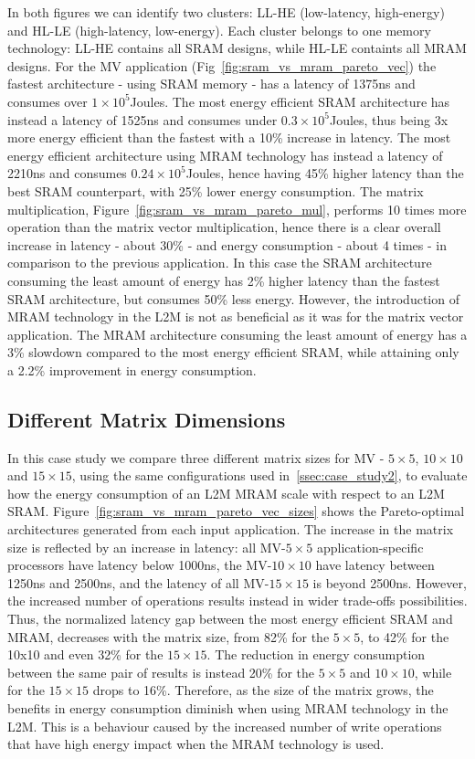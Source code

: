 In both figures we can identify two clusters: LL-HE (low-latency, high-energy) and HL-LE (high-latency, low-energy). Each cluster belongs to one memory technology: LL-HE contains all SRAM designs, while HL-LE containts all MRAM designs.
For the MV application (Fig~\ref{fig:sram_vs_mram_pareto_vec}) the fastest architecture - using SRAM memory - has a latency of 1375ns and consumes over $1\times10^5$Joules. The most energy efficient SRAM architecture has instead a latency of 1525ns and consumes under $0.3\times10^5$Joules, thus being 3x more energy efficient than the fastest with a 10\% increase in latency. The most energy efficient architecture using MRAM technology has instead a latency of 2210ns and consumes $0.24\times10^5$Joules, hence having 45\% higher latency than the best SRAM counterpart, with 25\% lower energy consumption. The matrix multiplication, Figure~\ref{fig:sram_vs_mram_pareto_mul}, performs 10 times more operation than the matrix vector multiplication, hence there is a clear overall increase in latency - about 30\% - and energy consumption - about 4 times -  in comparison to the previous application. In this case the SRAM architecture consuming the least amount of energy has 2\% higher latency than the fastest SRAM architecture, but consumes 50\% less energy. However, the introduction of MRAM technology in the L2M is not as beneficial as it was for the matrix vector application. The MRAM architecture consuming the least amount of energy has a 3\% slowdown compared to the most energy efficient SRAM, while attaining only a 2.2\% improvement in energy consumption.


\subsection{Different Matrix Dimensions}
\label{ssec:case_study3}
In this case study we compare three different matrix sizes for MV - $5\times5$, $10\times10$ and $15\times15$, using the same configurations used in~\ref{ssec:case_study2}, to evaluate how the energy consumption of an L2M MRAM scale with respect to an L2M SRAM. Figure~\ref{fig:sram_vs_mram_pareto_vec_sizes} shows the Pareto-optimal architectures generated from each input application. The increase in the matrix size is reflected by an increase in latency: all MV-$5\times5$ application-specific processors have latency below 1000ns, the MV-$10\times10$ have latency between 1250ns and 2500ns, and the latency of all MV-$15\times15$ is beyond 2500ns.
However, the increased number of operations results instead in wider trade-offs possibilities. Thus, the normalized latency gap between the most energy efficient SRAM and MRAM, decreases with the matrix size, from 82\% for the $5\times5$, to 42\% for the 10x10 and even 32\% for the $15\times15$. The reduction in energy consumption between the same pair of results is instead 20\% for the $5\times5$ and $10\times10$, while for the $15\times15$ drops to 16\%. Therefore, as the size of the matrix grows, the benefits in energy consumption diminish when using MRAM technology in the L2M. This is a behaviour caused by the increased number of write operations that have high energy impact when the MRAM technology is used.



